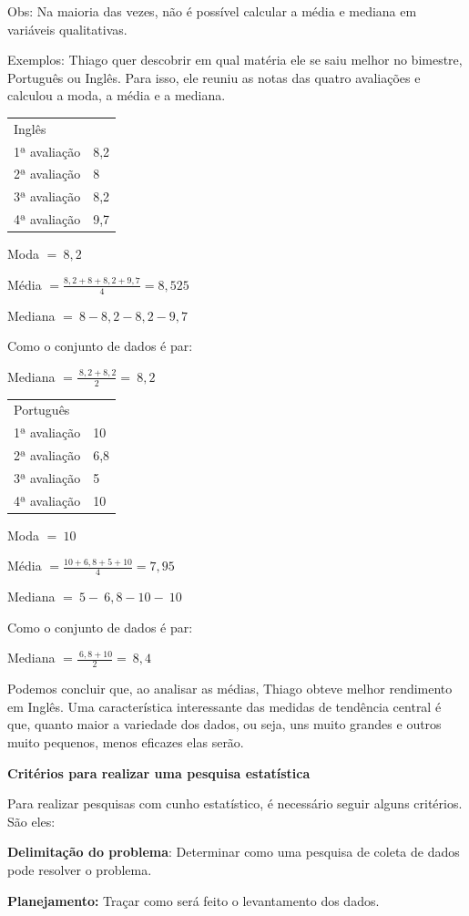Obs: Na maioria das vezes, não é possível calcular a média e mediana em
variáveis qualitativas.

Exemplos: Thiago quer descobrir em qual matéria ele se saiu melhor no
bimestre, Português ou Inglês. Para isso, ele reuniu as notas das quatro
avaliações e calculou a moda, a média e a mediana.

\begin{longtable}[]{@{}ll@{}}
\toprule
\endhead
Inglês &\tabularnewline
1ª avaliação & 8,2\tabularnewline
2ª avaliação & 8\tabularnewline
3ª avaliação & 8,2\tabularnewline
4ª avaliação & 9,7\tabularnewline
\bottomrule
\end{longtable}

Moda $= \ 8,2$

Média $= \frac{8,2 + 8 + 8,2 + 9,7}{4} = 8,525$

Mediana $= \ 8  - 8,2  - 8,2  - 9,7\ $ 

Como o conjunto de dados é par:

Mediana $ = \frac{\ 8,2 + 8,2}{2} = \ 8,2$

\begin{longtable}[]{@{}ll@{}}
\toprule
\endhead
Português~ &\tabularnewline
1ª avaliação & 10\tabularnewline
2ª avaliação & 6,8\tabularnewline
3ª avaliação & 5\tabularnewline
4ª avaliação & 10\tabularnewline
\bottomrule
\end{longtable}

Moda $= \ 10$

Média $= \frac{10 + 6,8 + 5 + 10}{4} = 7,95$

Mediana $= \ 5 - \ 6,8  - 10 - \ 10\ $

Como o conjunto de dados é par:

Mediana $= \frac{\ 6,8 + 10}{2} = \ 8,4$

Podemos concluir que, ao analisar as médias, Thiago obteve melhor
rendimento em Inglês. Uma característica interessante das medidas de
tendência central é que, quanto maior a variedade dos dados, ou seja,
uns muito grandes e outros muito pequenos, menos eficazes elas serão.

\textbf{Critérios para realizar uma pesquisa estatística~}

Para realizar pesquisas com cunho estatístico, é necessário seguir
alguns critérios. São eles:

\textbf{Delimitação do problema}: Determinar como uma pesquisa de coleta
de dados pode resolver o problema.

\textbf{Planejamento:} Traçar como será feito o levantamento dos dados.

